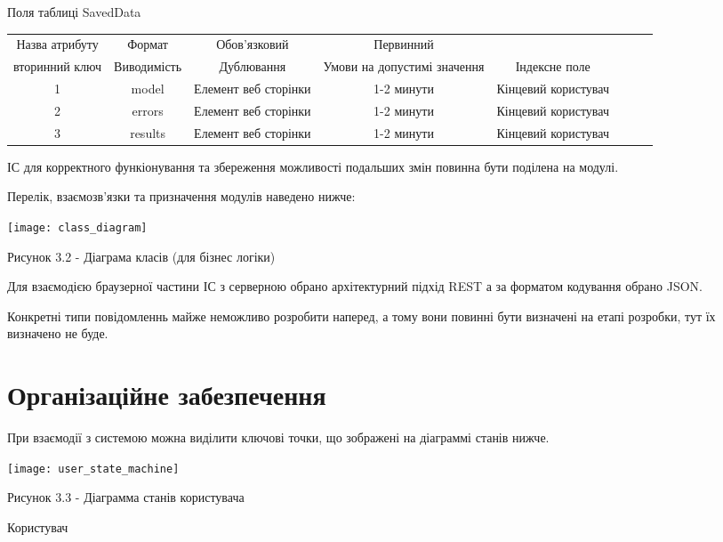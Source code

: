\begin{flushright}\small {Поля таблиці SavedData} \end{flushright}
\small{
\begin{tabular}{ | c | c | c | c | c | c | c | c | }
\hline
 Назва атрибуту & Формат& Обов'язковий & Первинний \\ вторинний  ключ & Виводимість & Дублювання & Умови на допустимі значення & Індексне поле \\
\hline
 1 & model & Елемент веб сторінки & 1-2 минути & Кінцевий користувач \\  
\hline
 2 & errors & Елемент веб сторінки & 1-2 минути & Кінцевий користувач \\  
\hline
 3 & results & Елемент веб сторінки & 1-2 минути & Кінцевий користувач \\  
\hline
\end{tabular}
}

ІС для корректного функіонування та збереження можливості подальших змін повинна бути поділена на модулі.

Перелік, взаємозв'язки та призначення модулів наведено нижче:

\begin{center}

\texttt{[image: class\_diagram]}

Рисунок 3.2 - Діаграма класів (для бізнес логіки)
\end{center}

Для взаємодією браузерної частини ІС з серверною обрано архітектурний підхід REST а за форматом кодування обрано JSON.

Конкретні типи повідомленнь майже неможливо розробити наперед, а тому вони повинні бути визначені на етапі розробки, тут їх визначено не буде.

\section{Організаційне забезпечення}

При взаємодії з системою можна виділити ключові точки, що зображені на діаграммі станів нижче.

\begin{center}

\texttt{[image: user\_state\_machine]}

Рисунок 3.3 - Діаграмма станів користувача
\end{center}

Користувач 

